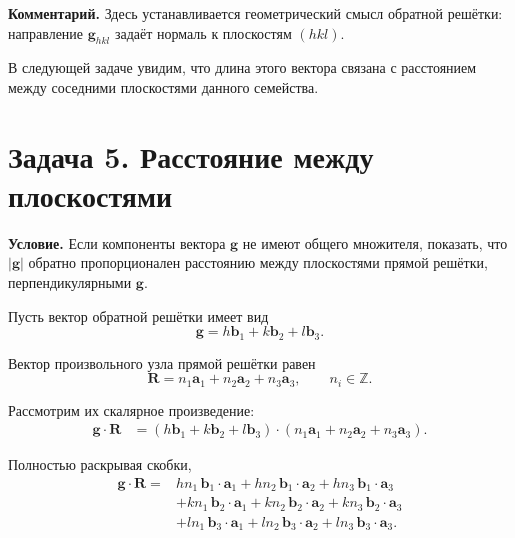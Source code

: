 \documentclass[../final.tex]{subfiles}
\begin{document}
\textbf{Комментарий.}
Здесь устанавливается геометрический смысл обратной решётки:
направление $\mathbf g_{hkl}$ задаёт нормаль к плоскостям
$(hkl)$.

В следующей задаче увидим, что длина этого вектора связана
с расстоянием между соседними плоскостями данного семейства.



\section{Задача 5. Расстояние между плоскостями}

\textbf{Условие.}
Если компоненты вектора $\mathbf g$ не имеют общего множителя,
показать, что $|\mathbf g|$ обратно пропорционален расстоянию
между плоскостями прямой решётки, перпендикулярными
$\mathbf g$.


%
%


Пусть вектор обратной решётки имеет вид
%
\begin{equation*}
    \mathbf g
    =
    h\mathbf b_1
    +
    k\mathbf b_2
    +
    l\mathbf b_3.
\end{equation*}

Вектор произвольного узла прямой решётки равен
%
\begin{equation*}
    \mathbf R
    =
    n_1\mathbf a_1
    +
    n_2\mathbf a_2
    +
    n_3\mathbf a_3,
    \qquad
    n_i\in\mathbb Z.
\end{equation*}

Рассмотрим их скалярное произведение:
%
\begin{align*}
    \mathbf g\cdot\mathbf R
    &=
    \left(
        h\mathbf b_1
        +
        k\mathbf b_2
        +
        l\mathbf b_3
    \right)
    \cdot
    \left(
        n_1\mathbf a_1
        +
        n_2\mathbf a_2
        +
        n_3\mathbf a_3
    \right).
\end{align*}

Полностью раскрывая скобки,
%
\begin{align*}
    \mathbf g\cdot\mathbf R
    ={}&
    hn_1\,\mathbf b_1\cdot\mathbf a_1
    +
    hn_2\,\mathbf b_1\cdot\mathbf a_2
    +
    hn_3\,\mathbf b_1\cdot\mathbf a_3
    \\
    &+
    kn_1\,\mathbf b_2\cdot\mathbf a_1
    +
    kn_2\,\mathbf b_2\cdot\mathbf a_2
    +
    kn_3\,\mathbf b_2\cdot\mathbf a_3
    \\
    &+
    ln_1\,\mathbf b_3\cdot\mathbf a_1
    +
    ln_2\,\mathbf b_3\cdot\mathbf a_2
    +
    ln_3\,\mathbf b_3\cdot\mathbf a_3.
\end{align*}
\end{document}
